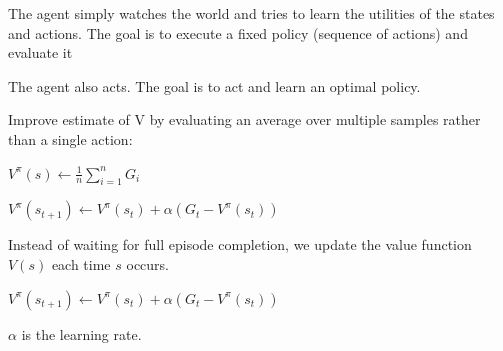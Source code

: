 \documentclass[
../EiKI_Summary.tex,
]
{subfiles}
\begin{document}
\begin{minipage}
    [t]{0.5\textwidth}
    \begin{defbox}
        The agent simply watches the world and tries to learn the utilities of the states and actions. The goal is to execute a fixed policy (sequence of actions) and evaluate it
    \end{defbox}
\end{minipage}
\begin{minipage}
    [t]{0.5\textwidth}
    \begin{defbox}
        The agent also acts. The goal is to act and learn an optimal policy.
    \end{defbox}
\end{minipage}

\begin{defbox}
    Improve estimate of V by evaluating an average over multiple samples rather than a single action:
    
    \begin{minipage}
        [t]{0.5\textwidth}
        \begin{mathbox}
        $V^\pi(s) \leftarrow \frac{1}{n} \sum_{i=1}^n G_i$
        \end{mathbox}
    \end{minipage}
    \begin{minipage}
        [t]{0.5\textwidth}
        \begin{mathbox}
            $V^\pi(s_{t+1}) \leftarrow V^\pi(s_t) + \alpha (G_t - V^\pi(s_t))$
        \end{mathbox}
    \end{minipage}

\end{defbox}

\begin{defbox}
    Instead of waiting for full episode completion, we update the value function $V(s)$ each time $s$ occurs. 

    \begin{csmb*}
        $V^\pi(s_{t+1}) \leftarrow V^\pi(s_t) + \alpha (G_t - V^\pi(s_t))$
    \end{csmb*}

    $\alpha$ is the learning rate.
\end{defbox}
\end{document}
